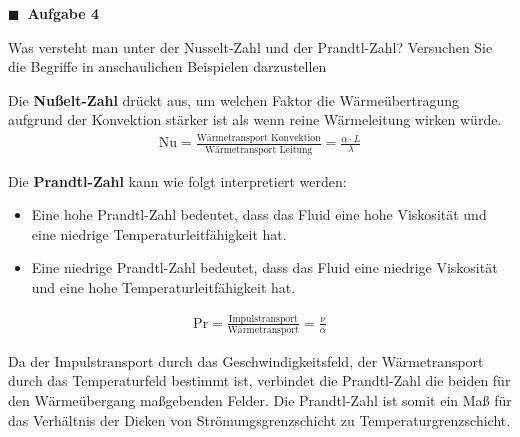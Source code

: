 \documentclass[aspectratio=169,9pt]{beamer}
\newcommand{\pp}{\par \vspace*{2mm}}
\newcommand{\antwort}[1]{
\begin{tcolorbox}[
	enhanced,
	colframe=unigrau!65,
	sharp corners,
	boxsep=1pt,
	colback=white,
	coltitle=black,
]
	#1
	\end{tcolorbox}
}
\begin{document}
\begin{frame}
\begin{minipage}{.5\textwidth}


{\color{miugray}$\blacksquare ~$} \textbf{Aufgabe 4} \par \vspace*{2mm}
Was versteht man unter der Nusselt-Zahl und der Prandtl-Zahl? Versuchen Sie die Begriffe in anschaulichen Beispielen darzustellen
\end{minipage}%
\hspace*{4mm}
\begin{minipage}{.5\textwidth}

\antwort{ \footnotesize
Die \textbf{Nußelt-Zahl} drückt aus, um welchen Faktor die Wärmeübertragung aufgrund der Konvektion stärker ist als wenn reine Wärmeleitung wirken würde.
\begin{align*}
\text{Nu} = \frac{\text{Wärmetransport Konvektion}}{\text{Wärmetransport Leitung}} = \frac{\alpha \cdot L}{\lambda}
\end{align*}

\pp
Die \textbf{Prandtl-Zahl} kann wie folgt interpretiert werden:

\begin{itemize}
\item Eine hohe Prandtl-Zahl bedeutet, dass das Fluid eine hohe Viskosität und eine niedrige Temperaturleitfähigkeit hat.
\item Eine niedrige Prandtl-Zahl bedeutet, dass das Fluid eine niedrige Viskosität und eine hohe Temperaturleitfähigkeit hat.
\end{itemize}

\par \vspace*{-4mm}
\begin{align*}
\text{Pr} = \frac{\text{Impulstransport}}{\text{Wärmetransport}} = \frac{\nu}{\alpha}
\end{align*}

Da der Impulstransport durch das Geschwindigkeitsfeld, der Wärmetransport durch das Temperaturfeld bestimmt ist, verbindet die Prandtl-Zahl die beiden für den Wärmeübergang maßgebenden Felder. Die Prandtl-Zahl ist somit ein Maß für das Verhältnis der Dicken von Strömungsgrenzschicht zu Temperaturgrenzschicht.
}

\end{minipage}%
\end{frame}
\end{document}
